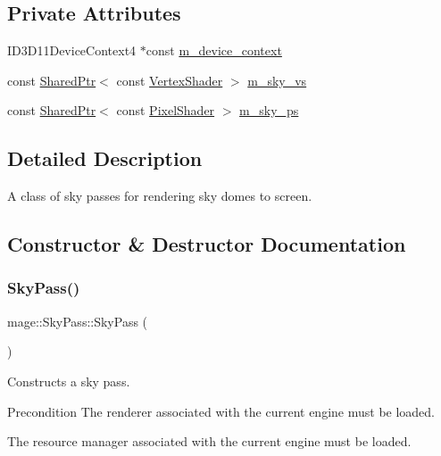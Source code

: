 \subsection*{Private Attributes}
\begin{DoxyCompactItemize}
\item 
I\+D3\+D11\+Device\+Context4 $\ast$const \hyperlink{classmage_1_1_sky_pass_aaa4d6a7c12dbad7938433f2d32107f27}{m\+\_\+device\+\_\+context}
\item 
const \hyperlink{namespacemage_a1e01ae66713838a7a67d30e44c67703e}{Shared\+Ptr}$<$ const \hyperlink{classmage_1_1_vertex_shader}{Vertex\+Shader} $>$ \hyperlink{classmage_1_1_sky_pass_a406ffced453d34b583a7bf975cf7f70f}{m\+\_\+sky\+\_\+vs}
\item 
const \hyperlink{namespacemage_a1e01ae66713838a7a67d30e44c67703e}{Shared\+Ptr}$<$ const \hyperlink{namespacemage_a27ecaf266420ee7a494d64edc0757129}{Pixel\+Shader} $>$ \hyperlink{classmage_1_1_sky_pass_abe9548ff1e4b3c15ac9004e4ba4ca052}{m\+\_\+sky\+\_\+ps}
\end{DoxyCompactItemize}


\subsection{Detailed Description}
A class of sky passes for rendering sky domes to screen. 

\subsection{Constructor \& Destructor Documentation}
\hypertarget{classmage_1_1_sky_pass_a41bb9d2d37f2c3a7bc5b12cffad9dafa}{}\label{classmage_1_1_sky_pass_a41bb9d2d37f2c3a7bc5b12cffad9dafa} 
\subsubsection{\texorpdfstring{Sky\+Pass()}{SkyPass()}\hspace{0.1cm}{\footnotesize\ttfamily [1/3]}}
{\footnotesize\ttfamily mage\+::\+Sky\+Pass\+::\+Sky\+Pass (\begin{DoxyParamCaption}{ }\end{DoxyParamCaption})}

Constructs a sky pass.

\begin{DoxyPrecond}{Precondition}
The renderer associated with the current engine must be loaded. 

The resource manager associated with the current engine must be loaded. 
\end{DoxyPrecond}
\hypertarget{classmage_1_1_sky_pass_a78be688fecb0a4f55df78d4af01c4590}{}\label{classmage_1_1_sky_pass_a78be688fecb0a4f55df78d4af01c4590} 
